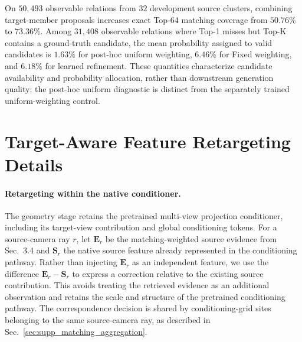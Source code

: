 \begin{appendix}
On $50{,}493$ observable relations from $32$ development source clusters, combining target-member proposals increases exact Top-64 matching coverage from $50.76\%$ to $73.36\%$.
Among $31{,}408$ observable relations where Top-1 misses but Top-K contains a ground-truth candidate, the mean probability assigned to valid candidates is $1.63\%$ for post-hoc uniform weighting, $6.46\%$ for Fixed weighting, and $6.18\%$ for learned refinement.
These quantities characterize candidate availability and probability allocation, rather than downstream generation quality; the post-hoc uniform diagnostic is distinct from the separately trained uniform-weighting control.

























\section{Target-Aware Feature Retargeting Details}
\label{sec:supp_target_retargeting}

\paragraph{Retargeting within the native conditioner.}
The geometry stage retains the pretrained multi-view projection conditioner, including its target-view contribution and global conditioning tokens.
For a source-camera ray $r$, let $\mathbf{E}_r$ be the matching-weighted source evidence from Sec.~3.4 and $\mathbf{S}_r$ the native source feature already represented in the conditioning pathway.
Rather than injecting $\mathbf{E}_r$ as an independent feature, we use the difference $\mathbf{E}_r-\mathbf{S}_r$ to express a correction relative to the existing source contribution.
This avoids treating the retrieved evidence as an additional observation and retains the scale and structure of the pretrained conditioning pathway.
The correspondence decision is shared by conditioning-grid sites belonging to the same source-camera ray, as described in Sec.~\ref{sec:supp_matching_aggregation}.


\end{appendix}
